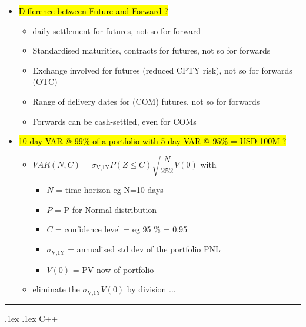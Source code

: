 \documentclass[10pt,landscape,a4paper]{article}
\makeatletter
\renewcommand{\section}{\@startsection{section}{1}{0mm}%
                                {.1ex}%
                                {.1ex}%
                                {\color{blue}\sffamily\small\bfseries}}
\makeatother
\begin{document}
\begin{multicols*}{4}
\begin{spacing}{0.1}
\begin{itemize}
\item \hl{Difference between Future and Forward ?}
\begin{itemize}
	\item daily settlement for futures, not so for forward
	\item Standardised maturities, contracts for futures, not so for forwards
	\item Exchange involved for futures (reduced CPTY risk), not so for forwards (OTC)
	\item Range of delivery dates for (COM) futures, not so for forwards
	\item Forwards can be cash-settled, even for COMs
		
\end{itemize}

\item \hl{10-day VAR @ 99\% of a portfolio with 5-day VAR @ 95\% = USD 100M  ?}
\begin{itemize}
	\item $VAR(N,C)=\sigma_{\text{V,1Y}} P(Z \le C) \sqrt{ \dfrac{N}{252}}V(0)$ with
	\begin{itemize}
		\item $N$ = time horizon eg N=10-days
		\item $P$ = P for Normal distribution
		\item $C$ = confidence level = eg 95 \% = 0.95
		\item $\sigma_{\text{V,1Y}}$ = annualised std dev of the portfolio PNL
		\item $V(0)$ = PV now of portfolio
	\end{itemize}
	\item eliminate the $\sigma_{\text{V,1Y}} V(0)$ by division ...
\end{itemize}

\end{itemize}

\hrule
\section {C++}

\end{spacing}
\end{multicols*}
\end{document}
